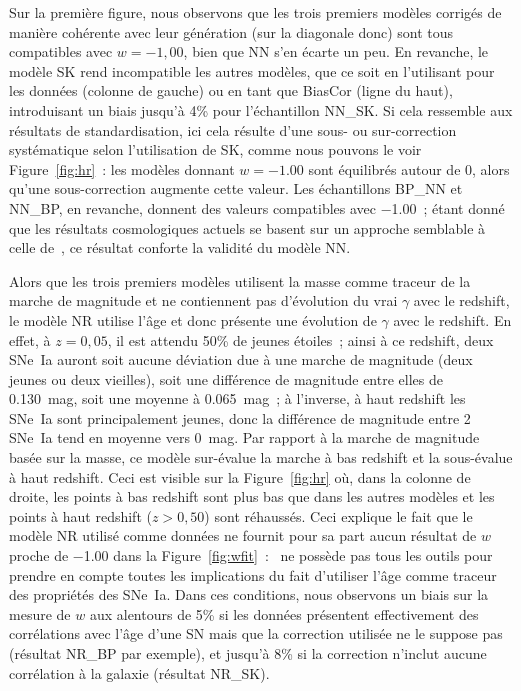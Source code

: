\documentclass[../main/main.tex]{subfiles}
\begin{document}
Sur la première figure, nous observons que les trois premiers modèles corrigés
de manière cohérente avec leur génération (sur la diagonale donc) sont tous
compatibles avec $w = -1,00$, bien que NN s'en écarte un peu. En revanche, le
modèle SK rend incompatible les autres modèles, que ce soit en l'utilisant pour
les données (colonne de gauche) ou en tant que BiasCor (ligne du haut),
introduisant un biais jusqu'à 4\% pour l'échantillon NN\_SK. Si cela ressemble
aux résultats de standardisation, ici cela résulte d'une sous- ou sur-correction
systématique selon l'utilisation de SK, comme nous pouvons le voir
Figure~\ref{fig:hr}~: les modèles donnant $w = \num{-1.00}$ sont équilibrés
autour de 0, alors qu'une sous-correction augmente cette valeur. Les
échantillons BP\_NN et NN\_BP, en revanche, donnent des valeurs compatibles avec
\num{-1.00}~; étant donné que les résultats cosmologiques actuels se basent sur
un approche semblable à celle de~, ce résultat conforte la
validité du modèle NN.

Alors que les trois premiers modèles utilisent la masse comme traceur de la
marche de magnitude et ne contiennent pas d'évolution du vrai $\gamma$ avec le
redshift, le modèle NR utilise l'âge et donc présente une évolution de $\gamma$
avec le redshift. En effet, à $z=0,05$, il est attendu 50\% de jeunes étoiles~;
ainsi à ce redshift, deux SNe~Ia auront soit aucune déviation due à une marche
de magnitude (deux jeunes ou deux vieilles), soit une différence de magnitude
entre elles de \SI{0.130}{mag}, soit une moyenne à \SI{0.065}{mag}~; à
l'inverse, à haut redshift les SNe~Ia sont principalement jeunes, donc la
différence de magnitude entre 2 SNe~Ia tend en moyenne vers \SI{0}{mag}. Par
rapport à la marche de magnitude basée sur la masse, ce modèle sur-évalue la
marche à bas redshift et la sous-évalue à haut redshift. Ceci est visible sur la
Figure~\ref{fig:hr} où, dans la colonne de droite, les points à bas redshift
sont plus bas que dans les autres modèles et les points à haut redshift
($z>0,50$) sont réhaussés. Ceci explique le fait que le modèle NR utilisé comme
données ne fournit pour sa part aucun résultat de $w$ proche de \num{-1.00} dans
la Figure~\ref{fig:wfit}~: \snana\ ne possède pas tous les outils pour prendre
en compte toutes les implications du fait d'utiliser l'âge comme traceur des
propriétés des SNe~Ia. Dans ces conditions, nous observons un biais sur la
mesure de $w$ aux alentours de 5\% si les données présentent effectivement des
corrélations avec l'âge d'une SN mais que la correction utilisée ne le suppose
pas (résultat NR\_BP par exemple), et jusqu'à 8\% si la correction n'inclut
aucune corrélation à la galaxie (résultat NR\_SK).
\end{document}
